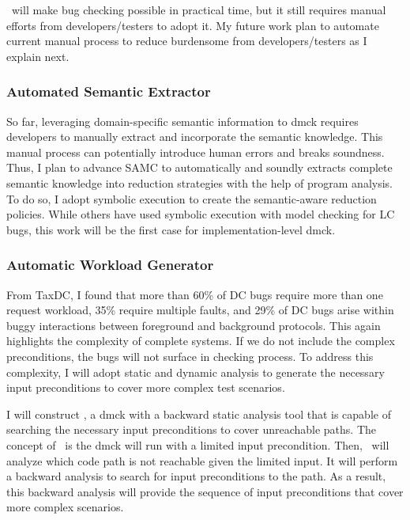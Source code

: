 \documentclass[11pt]{article}
\begin{document}
\fullcheck\ will make bug checking possible in practical time, but it still
requires manual efforts from developers/testers to adopt it. My future work plan
to automate current manual process to reduce burdensome from developers/testers
as I explain next.

\subsubsection*{Automated Semantic Extractor}

So far, leveraging domain-specific semantic information to dmck requires
developers to manually extract and incorporate the semantic knowledge. This
manual process can potentially introduce human errors and breaks soundness.
Thus, I plan to advance SAMC to automatically and soundly extracts complete
semantic knowledge into reduction strategies with the help of program analysis.
To do so, I adopt symbolic execution to create the semantic-aware reduction
policies. While others have used symbolic execution with model checking for LC
bugs, this work will be the first case for implementation-level dmck. 

\subsubsection*{Automatic Workload Generator}

From TaxDC, I found that more than 60\% of DC bugs require more than one
request workload, 35\% require multiple faults, and 29\% of DC bugs arise
within buggy interactions between foreground and background protocols. This
again highlights the complexity of complete systems. If we do not include the
complex preconditions, the bugs will not surface in checking process. To
address this complexity, I will adopt static and dynamic analysis to generate
the necessary input preconditions to cover more complex test scenarios.

I will construct \deepcheck, a dmck with a backward
static analysis tool that is capable of searching the necessary input
preconditions to cover unreachable paths. The concept of \deepcheck\ is the dmck
will run with a limited input precondition. Then, \deepcheck\ will analyze which
code path is not reachable given the limited input. It will perform a backward
analysis to search for input preconditions to the path. As a result, this
backward analysis will provide the sequence of input preconditions that cover
more complex scenarios.
\fi

\end{document}
